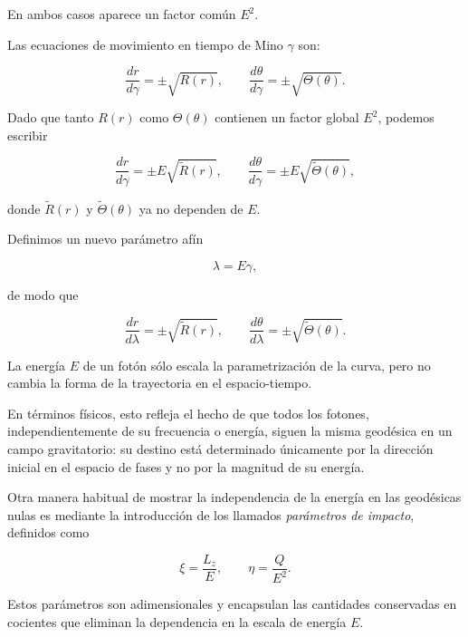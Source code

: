En ambos casos aparece un factor común \(E^2\).


Las ecuaciones de movimiento en tiempo de Mino \(\gamma\) son:

\begin{equation}
\frac{dr}{d\gamma} = \pm \sqrt{R(r)}, \qquad
\frac{d\theta}{d\gamma} = \pm \sqrt{\Theta(\theta)}.
\end{equation}

Dado que tanto \(R(r)\) como \(\Theta(\theta)\) contienen un factor global \(E^2\), 
podemos escribir

\begin{equation}
\frac{dr}{d\gamma} = \pm E \sqrt{\tilde{R}(r)}, \qquad
\frac{d\theta}{d\gamma} = \pm E \sqrt{\tilde{\Theta}(\theta)},
\end{equation}

donde \(\tilde{R}(r)\) y \(\tilde{\Theta}(\theta)\) ya no dependen de \(E\).

Definimos un nuevo parámetro afín

\begin{equation}
\lambda = E\gamma,
\end{equation}

de modo que

\begin{equation}
\frac{dr}{d\lambda} = \pm \sqrt{\tilde{R}(r)}, \qquad
\frac{d\theta}{d\lambda} = \pm \sqrt{\tilde{\Theta}(\theta)}.
\end{equation}

La energía \(E\) de un fotón sólo escala la parametrización de la curva, 
pero no cambia la forma de la trayectoria en el espacio-tiempo. 

En términos físicos, esto refleja el hecho de que todos los fotones, independientemente 
de su frecuencia o energía, siguen la misma geodésica en un campo gravitatorio: 
su destino está determinado únicamente por la dirección inicial en el espacio de fases 
y no por la magnitud de su energía.


Otra manera habitual de mostrar la independencia de la energía en las geodésicas nulas 
es mediante la introducción de los llamados \emph{parámetros de impacto}, definidos como

\begin{equation}
\xi = \frac{L_z}{E}, \qquad \eta = \frac{Q}{E^2}.
\end{equation}

Estos parámetros son adimensionales y encapsulan las cantidades conservadas en cocientes 
que eliminan la dependencia en la escala de energía \(E\). 


